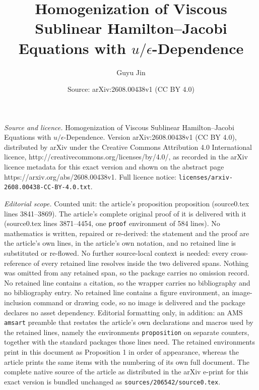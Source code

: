 \documentclass[10pt,a4paper]{amsart}
\title{Homogenization of Viscous Sublinear Hamilton--Jacobi Equations with $u/\epsilon$-Dependence}
\author{Guyu Jin}
\date{Source: arXiv:2608.00438v1 (CC BY 4.0)}
\begin{document}
\maketitle

\noindent\emph{Source and licence.} Homogenization of Viscous Sublinear Hamilton--Jacobi Equations with $u/\epsilon$-Dependence. Version arXiv:2608.00438v1 (CC BY 4.0), distributed by arXiv under the Creative Commons Attribution 4.0 International licence, http://creativecommons.org/licenses/by/4.0/, as recorded in the arXiv licence metadata for this exact version and shown on the abstract page https://arxiv.org/abs/2608.00438v1. Full licence notice: \texttt{licenses/arxiv-2608.00438-CC-BY-4.0.txt}.\par\smallskip

\noindent\textit{Editorial scope.} Counted unit: the article's proposition proposition (source0.tex lines 3841--3869). The article's complete original proof of it is delivered with it (source0.tex lines 3871--4454, one \texttt{proof} environment of 584 lines). No mathematics is written, repaired or re-derived: the statement and the proof are the article's own lines, in the article's own notation, and no retained line is substituted or re-flowed.  No further source-local context is needed: every cross-reference of every retained line resolves inside the two delivered spans.  Nothing was omitted from any retained span, so the package carries no omission record.  No retained line contains a citation, so the wrapper carries no bibliography and no bibliography entry.  No retained line contains a figure environment, an image-inclusion command or drawing code, so no image is delivered and the package declares no asset dependency.  Editorial formatting only, in addition: an AMS \texttt{amsart} preamble that restates the article's own declarations and macros used by the retained lines, namely the environments \texttt{proposition} on separate counters, together with the standard packages those lines need.  The retained environments print in this document as Proposition 1 in order of appearance, whereas the article prints the same items with the numbering of its own full document.  The complete native source of the article as distributed in the arXiv e-print for this exact version is bundled unchanged as \texttt{sources/206542/source0.tex}.
\end{document}
